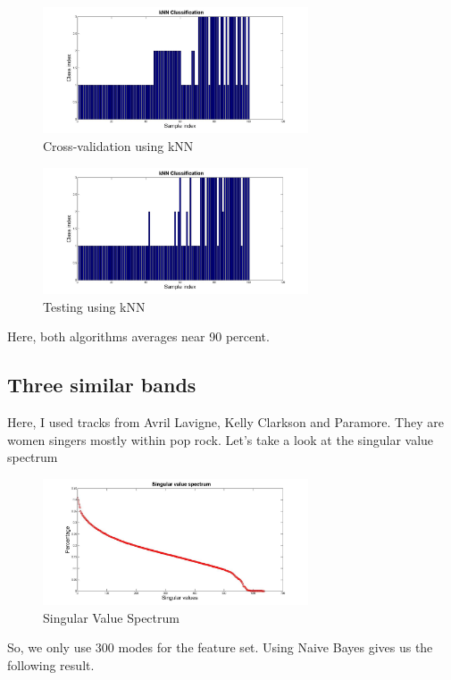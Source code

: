 \documentclass[a4paper]{article}
\begin{document}
\begin{figure}[H] 
	\centering
	\includegraphics[width=0.7\textwidth]{knn2.jpg}
	\caption{Cross-validation using kNN}	
\end{figure}

\begin{figure}[H] 
	\centering
	\includegraphics[width=0.7\textwidth]{knn1.jpg}
	\caption{Testing using kNN}	
\end{figure}

Here, both algorithms averages near 90 percent.
\subsection{Three similar bands}

Here, I used tracks from Avril Lavigne, Kelly Clarkson and Paramore. They are women singers mostly within pop rock. Let's take a look at the singular value spectrum
\begin{figure}[H] 
	\centering
	\includegraphics[width=0.7\textwidth]{svd.jpg}
	\caption{Singular Value Spectrum}	
\end{figure}

So, we only use 300 modes for the feature set. Using Naive Bayes gives us the following result.
\end{document}
